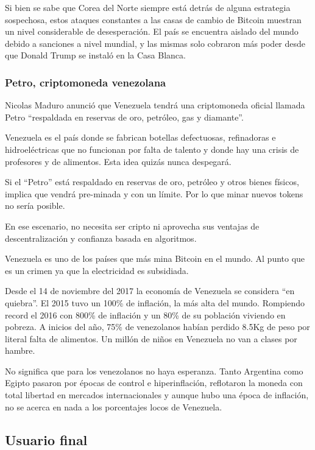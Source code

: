 \documentclass[12pt,letterpaper]{article}
\begin{document}
               Si bien se sabe que Corea del Norte siempre est\'a detr\'as de alguna estrategia sospechosa, estos ataques constantes a las casas de cambio de Bitcoin muestran un nivel considerable de desesperaci\'on. El pa\'is se encuentra aislado del mundo debido a sanciones a nivel mundial, y las mismas solo cobraron m\'as poder desde que Donald Trump se instal\'o en la Casa Blanca.
              
\subsubsection*{Petro, criptomoneda venezolana}
Nicolas Maduro anunció que Venezuela tendrá una criptomoneda oficial llamada Petro “respaldada en reservas de oro, petróleo, gas y diamante”.

Venezuela es el país donde se fabrican botellas defectuosas, refinadoras e hidroeléctricas que no funcionan por falta de talento y donde hay una crisis de profesores y de alimentos. Esta idea quizás nunca despegará.

Si el “Petro” está respaldado en reservas de oro, petróleo y otros bienes físicos, implica que vendrá pre-minada y con un límite. Por lo que minar nuevos tokens no sería posible.

En ese escenario, no necesita ser cripto ni aprovecha sus ventajas de descentralización y confianza basada en algoritmos. 

Venezuela es uno de los países que más mina Bitcoin en el mundo. Al punto que es un crimen ya que la electricidad es subsidiada.

Desde el 14 de noviembre del 2017 la economía de Venezuela se considera “en quiebra”. El 2015 tuvo un 100\% de inflación, la más alta del mundo. Rompiendo record el 2016 con 800\% de inflación y un 80\% de su población viviendo en pobreza. A inicios del año, 75\% de venezolanos habían perdido 8.5Kg de peso por literal falta de alimentos. Un millón de niños en Venezuela no van a clases por hambre.

No significa que para los venezolanos no haya esperanza. Tanto Argentina como Egipto pasaron por épocas de control e hiperinflación, reflotaron la moneda con total libertad en mercados internacionales y aunque hubo una época de inflación, no se acerca en nada a los porcentajes locos de Venezuela.
        \subsection*{Usuario final}
\end{document}
